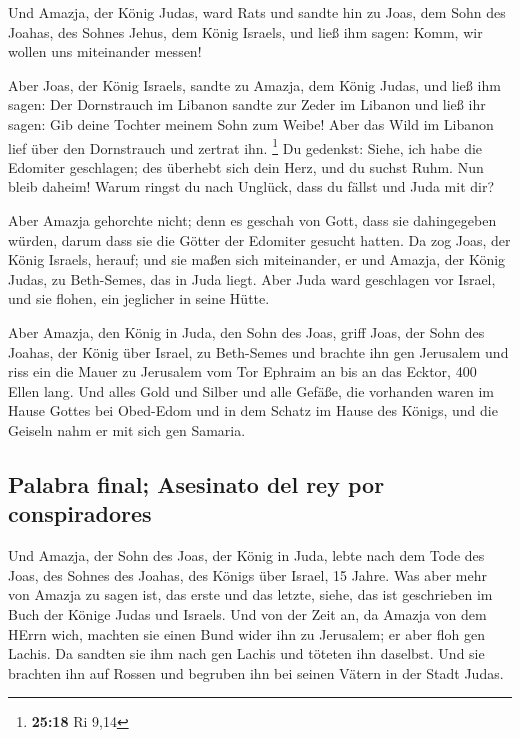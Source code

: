  Und Amazja, der König Judas, ward Rats und sandte hin zu
Joas, dem Sohn des Joahas, des Sohnes Jehus, dem König Israels, und ließ
ihm sagen: Komm, wir wollen uns miteinander messen!

 Aber Joas, der König Israels, sandte zu Amazja, dem
König Judas, und ließ ihm sagen: Der Dornstrauch im Libanon sandte zur
Zeder im Libanon und ließ ihr sagen: Gib deine Tochter meinem Sohn zum
Weibe! Aber das Wild im Libanon lief über den Dornstrauch und zertrat
ihn. \footnote{\textbf{25:18} Ri 9,14}  Du gedenkst:
Siehe, ich habe die Edomiter geschlagen; des überhebt sich dein Herz,
und du suchst Ruhm. Nun bleib daheim! Warum ringst du nach Unglück, dass
du fällst und Juda mit dir?

 Aber Amazja gehorchte nicht; denn es geschah von Gott,
dass sie dahingegeben würden, darum dass sie die Götter der Edomiter
gesucht hatten.  Da zog Joas, der König Israels, herauf;
und sie maßen sich miteinander, er und Amazja, der König Judas, zu
Beth-Semes, das in Juda liegt.  Aber Juda ward geschlagen
vor Israel, und sie flohen, ein jeglicher in seine Hütte.

 Aber Amazja, den König in Juda, den Sohn des Joas, griff
Joas, der Sohn des Joahas, der König über Israel, zu Beth-Semes und
brachte ihn gen Jerusalem und riss ein die Mauer zu Jerusalem vom Tor
Ephraim an bis an das Ecktor, 400 Ellen lang.  Und alles
Gold und Silber und alle Gefäße, die vorhanden waren im Hause Gottes bei
Obed-Edom und in dem Schatz im Hause des Königs, und die Geiseln nahm er
mit sich gen Samaria.

\hypertarget{palabra-final-asesinato-del-rey-por-conspiradores}{%
\subsection{Palabra final; Asesinato del rey por
conspiradores}\label{palabra-final-asesinato-del-rey-por-conspiradores}}

 Und Amazja, der Sohn des Joas, der König in Juda, lebte
nach dem Tode des Joas, des Sohnes des Joahas, des Königs über Israel,
15 Jahre.  Was aber mehr von Amazja zu sagen ist, das
erste und das letzte, siehe, das ist geschrieben im Buch der Könige
Judas und Israels.  Und von der Zeit an, da Amazja von
dem HErrn wich, machten sie einen Bund wider ihn zu Jerusalem; er aber
floh gen Lachis. Da sandten sie ihm nach gen Lachis und töteten ihn
daselbst.  Und sie brachten ihn auf Rossen und begruben
ihn bei seinen Vätern in der Stadt Judas.

